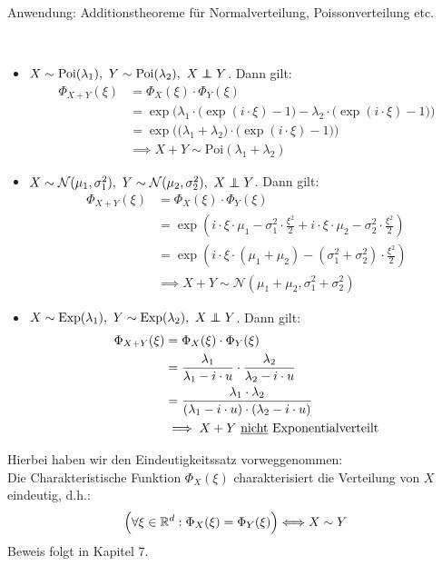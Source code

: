 Anwendung: Additionstheoreme für Normalverteilung, Poissonverteilung etc.

\begin{beisp}\
	\begin{itemize}
		\item $X\sim\text{Poi}(\lambda_1),~Y\sim\text{Poi}(\lambda_2),~X\unab Y$. Dann gilt:
		\begin{align*}
			\Phi_{X+Y}(\xi)
			&=\Phi_X(\xi)\cdot\Phi_Y(\xi)\\
			&=\exp\Big(\lambda_1\cdot\big(\exp(i\cdot\xi)-1\big)-\lambda_2\cdot\big(\exp(i\cdot\xi)-1\big)\Big)\\
			&=\exp\Big(\big(\lambda_1+\lambda_2\big)\cdot\big(\exp(i\cdot\xi)-1\big)\Big)\\
			&\implies X+Y\sim\text{Poi}(\lambda_1+\lambda_2)
		\end{align*}
		\item $X\sim\mathcal{N}(\mu_1,\sigma_1^2),~Y\sim\mathcal{N}(\mu_2,\sigma_2^2),~X\unab Y$. Dann gilt:
		\begin{align*}
			\Phi_{X+Y}(\xi)
			&=\Phi_X(\xi)\cdot\Phi_Y(\xi)\\
			&=\exp\left(i\cdot\xi\cdot\mu_1-\sigma_1^2\cdot\frac{\xi^2}{2}+i\cdot\xi\cdot\mu_2-\sigma_2^2\cdot\frac{\xi^2}{2}\right)\\
			&=\exp\left(i\cdot\xi\cdot(\mu_1+\mu_2)-(\sigma_1^2+\sigma_2^2)\cdot\frac{\xi^2}{2}\right)\\
			&\implies
			X+Y\sim\mathcal{N}(\mu_1+\mu_2,\sigma_1^2+\sigma_2^2)
		\end{align*}
		\item $X\sim\text{Exp}(\lambda_1),~Y\sim\text{Exp}(\lambda_2),~X\unab Y$. Dann gilt:
		\begin{align*}
			\Phi_{X+Y}(\xi)
			&=\Phi_X(\xi)\cdot\Phi_Y(\xi) \\
			&=\frac{\lambda_1}{\lambda_1-i\cdot u}\cdot\frac{\lambda_2}{\lambda_2-i\cdot u} \\
			&=\frac{\lambda_1\cdot\lambda_2}{(\lambda_1-i\cdot u)\cdot(\lambda_2-i\cdot u)}\\
			&\implies X+Y\text{ \underline{nicht} Exponentialverteilt}
		\end{align*}
	\end{itemize}
\end{beisp}

\begin{bemerkung}
	Hierbei haben wir den Eindeutigkeitssatz vorweggenommen:\\
	Die Charakteristische Funktion $\Phi_X(\xi)$ charakterisiert die Verteilung von $X$ eindeutig, d.h.:
	\begin{align*}
		\Big(\forall\xi\in\mathbb{R}^d:\Phi_X(\xi)=\Phi_Y(\xi)\Big)\Longleftrightarrow X\sim Y
	\end{align*}
	Beweis folgt in Kapitel 7.
\end{bemerkung}

